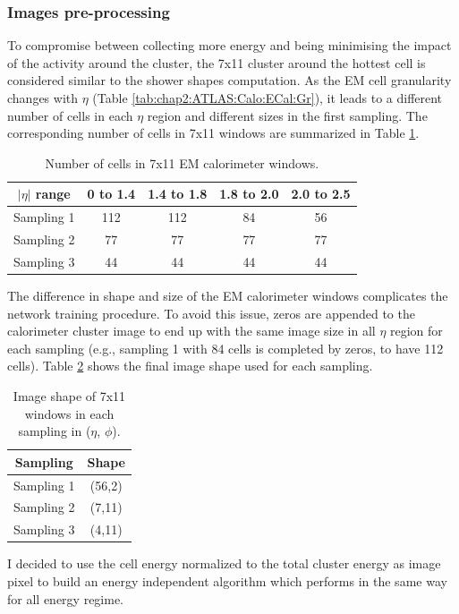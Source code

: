 \subsubsection{Images pre-processing}
\label{gamma:CNN:PreProcessing}
To compromise between collecting more energy and being minimising the impact of the activity around the cluster, the 7x11 cluster around the hottest cell is considered similar to the shower shapes computation. As the EM cell granularity changes with $\eta$ (Table \ref{tab:chap2:ATLAS:Calo:ECal:Gr}), it leads to a different number of cells in each $\eta$ region and different sizes in the first sampling. The corresponding number of cells in 7x11 windows are summarized in Table \ref{tab:gamma:CNN:PreProcessing:NCells}.
\begin{table}[htbp]
    \centering
    \begin{tabular}{ccccc}
    \hline
        $|\eta|$ range & 0 to 1.4 & 1.4 to 1.8 & 1.8 to 2.0 & 2.0 to 2.5 \\
    \hline
        Sampling 1 & 112 & 112 & 84 & 56 \\
        Sampling 2 & 77 & 77 & 77 & 77 \\
        Sampling 3 & 44 & 44 & 44 & 44 \\
    \hline
    \end{tabular}
    \caption{Number of cells in 7x11 EM calorimeter windows.}
    \label{tab:gamma:CNN:PreProcessing:NCells}
\end{table}
The difference in shape and size of the EM calorimeter windows complicates the network training procedure. To avoid this issue, zeros are appended to the calorimeter cluster image to end up with the same image size in all $\eta$ region for each sampling (e.g., sampling 1 with 84 cells is completed by zeros, to have 112 cells). Table \ref{tab:gamma:CNN:PreProcessing:ImgSize} shows the final image shape used for each sampling.
\begin{table}[htbp]
    \centering
    \begin{tabular}{cc}
    \hline
        Sampling & Shape \\
    \hline
        Sampling 1 & (56,2)\\
        Sampling 2 & (7,11)  \\
        Sampling 3 & (4,11) \\
    \hline
    \end{tabular}
    \caption{Image shape of 7x11 windows in each sampling in ($\eta$, $\phi$).}
    \label{tab:gamma:CNN:PreProcessing:ImgSize}
\end{table}
I decided to use the cell energy normalized to the total cluster energy as image pixel to build an energy independent algorithm which performs in the same way for all energy regime.

